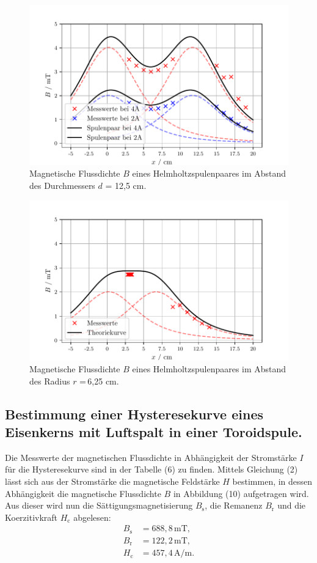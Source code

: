 \begin{figure}[H]
  \centering
  \includegraphics{helmholtzD.pdf}
  \caption{Magnetische Flussdichte $B$ eines Helmholtzspulenpaares im Abstand des Durchmessers $d$ = 12,5 cm.}
  \label{fig:plot}
\end{figure}

\begin{figure}[H]
  \centering
  \includegraphics{helmholtzR.pdf}
  \caption{Magnetische Flussdichte $B$ eines Helmholtzspulenpaares im Abstand des Radius $r$ =\,6,25 cm.}
  \label{fig:plot}
\end{figure}


\subsection{Bestimmung einer Hysteresekurve eines Eisenkerns mit Luftspalt in einer Toroidspule.}
Die Messwerte der magnetischen Flussdichte in Abhängigkeit der Stromstärke $I$
für die Hysteresekurve sind in der Tabelle (6) zu finden. Mittels Gleichung (2) lässt sich aus
der Stromstärke die magnetische Feldstärke $H$ bestimmen, in dessen Abhängigkeit die magnetische
Flussdichte $B$ in Abbildung (10) aufgetragen wird.\\
Aus dieser wird nun die Sättigungsmagnetisierung $B_\text{s}$, die Remanenz $B_\text{r}$ und 
die Koerzitivkraft $H_\text{c}$ abgelesen:
\begin{align*}
B_\text{s} &= 688,8\,\si{\milli\tesla},\\
B_\text{r} &= 122,2\,\si{\milli\tesla},\\
H_\text{c} &= 457,4\,\si{\ampere\per\meter}.
\end{align*}

